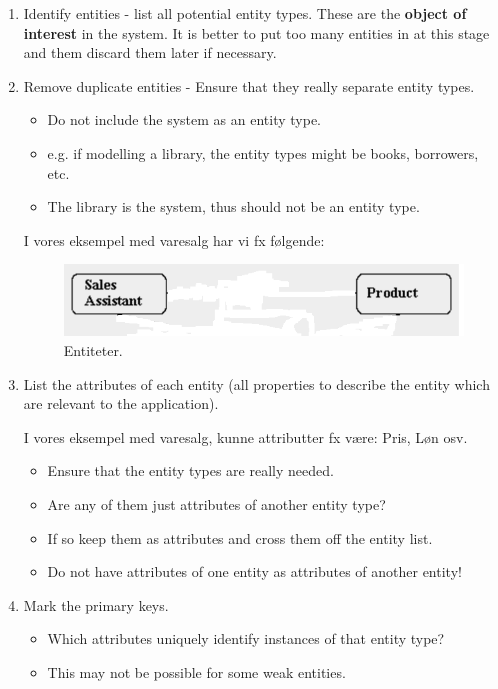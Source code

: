 \begin{enumerate}
	\item Identify entities - list all potential entity types. These are the \textbf{object of interest} in the system. It is better to put too many entities in at this stage and them discard them later if necessary.
	\item Remove duplicate entities - Ensure that they really separate entity types.
	
	\begin{itemize}
		\item Do not include the system as an entity type. \item e.g. if modelling a library, the entity types might be books, borrowers, etc.
		\item The library is the system, thus should not be an entity type.
	\end{itemize}
	
	I vores eksempel med varesalg har vi fx følgende:
	\begin{figure}[H]
		\centering
		\includegraphics[width=0.7\linewidth]{figs/spm1/salesProductEntities.png}
		\caption{Entiteter.}
		\label{fig:salesProductEntities}
	\end{figure}

	
	\item List the attributes of each entity (all properties to describe the entity which are relevant to the application).
	
	I vores eksempel med varesalg, kunne attributter fx være: Pris, Løn osv.
	
	\begin{itemize}
		\item Ensure that the entity types are really needed.
		\item Are any of them just attributes of another entity type?
		\item If so keep them as attributes and cross them off the entity list.
		\item Do not have attributes of one entity as attributes of another entity!
	\end{itemize}
	
	\item Mark the primary keys.
	
	\begin{itemize}
		\item Which attributes uniquely identify instances of that entity type?
		\item This may not be possible for some weak entities.
	\end{itemize}
	

\end{enumerate}
